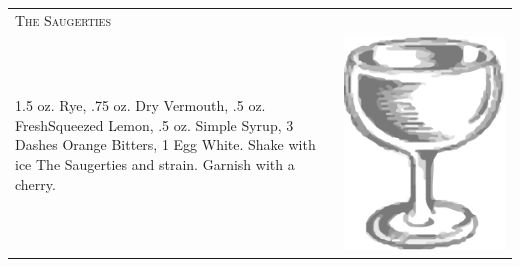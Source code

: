 \documentclass{article}
\begin{document}
\begin{tabular}{p{2in} p{0.5in}}
  \multicolumn{2}{p{3in}}{\centering\Huge\textsc{The Saugerties}} \\ 
  
   \vspace{-0.1in}1.5 oz. Rye, .75 oz. Dry Vermouth, .5 oz. FreshSqueezed
    Lemon, .5 oz. Simple Syrup, 3 Dashes Orange Bitters, 1 Egg
    White. Shake with ice The Saugerties and strain. Garnish with a
    cherry. &  \vspace{-0.1in} \includegraphics{coupe.png}
\end{tabular}
\end{document}
